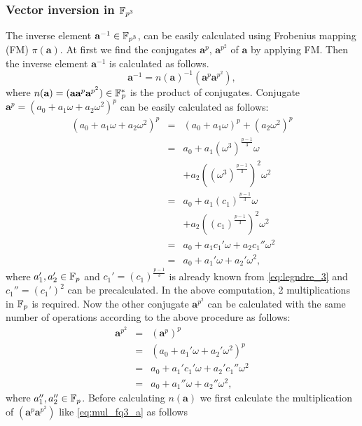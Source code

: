 \subsubsection{Vector inversion in $\mathbb{F}_{p^3}$}
The inverse element $\textbf{a}^{-1} \in {\mathbb{F}}_{p^{3}}$, can be easily calculated using Frobenius mapping (FM) $\pi(\textbf{a})$. At first we find the conjugates $\textbf{a}^p$, $\textbf{a}^{p^2}$ of $\textbf{a}$ by applying FM. Then the inverse element $\textbf{a}^{-1}$  is calculated as follows.
\begin{equation}
\textbf{a}^{-1} = n(\textbf{a})^{-1}(\textbf{a}^p\textbf{a}^{p^2}), \label{Inv_Cal_fq3}
\end{equation}
where $n(\textbf{a})= (\textbf{a}\textbf{a}^{p}\textbf{a}^{p^2}) \in {{\mathbb{F}}^{\ast}}_{\!\!\!p}$ is the product of conjugates. Conjugate $\textbf{a}^p=  (a_0+a_1\omega+a_2 \omega^2)^p$ can be easily calculated as follows:
\begin{eqnarray}\label{eq:FM_aq}
(a_0+a_1\omega+a_2 \omega^2)^p& = & (a_0 + a_1 \omega)^p+ (a_2 \omega^2)^p\nonumber\\
& = & a_0+a_1(\omega^3)^{\frac{p-1}{3}}\omega  \nonumber \\ 
& & + a_2 ((\omega^3)^{\frac{p-1}{3}})^2 \omega^2  \nonumber \\ 
& = & a_0+a_1(c_1)^{\frac{p-1}{3}} \omega  \nonumber \\
& & + a_2 ((c_1)^{\frac{p-1}{3}})^2 \omega^2 \nonumber \\
& = & a_0 + a_1 c_1' \omega + a_2 c_1'' \omega^2 \nonumber \\
& = & a_0 + a_1' \omega + a_2' \omega^2,
\end{eqnarray}
where $a_1', a_2' \in \mathbb{F}_p$ and $c_1' = (c_1)^{\frac{p-1}{3}}$ is already known from \eqref{eq:legndre_3} and $c_1'' = (c_1')^2$ can be precalculated. In the above computation, 2 multiplications in $\mathbb{F}_p$ is required. 
Now the other conjugate $\textbf{a}^{p^2}$ can be calculated with the same number of operations according to the above procedure as follows:
\begin{eqnarray}
\textbf{a}^{p^2} & = & (\textbf{a}^p)^p\nonumber \\
& = &  (a_0 + a_1' \omega + a_2' \omega^2)^p\nonumber \\
& = & a_0 + a_1' c_1' \omega + a_2' c_1'' \omega^2 \nonumber \\
& = & a_0 + a_1'' \omega + a_2'' \omega^2,
\end{eqnarray} 
where $a_1'', a_2'' \in \mathbb{F}_p$.
Before calculating $n(\textbf{a})$ we first calculate the multiplication of $(\textbf{a}^p\textbf{a}^{p^2})$ like \eqref{eq:mul_fq3_a} as follows

